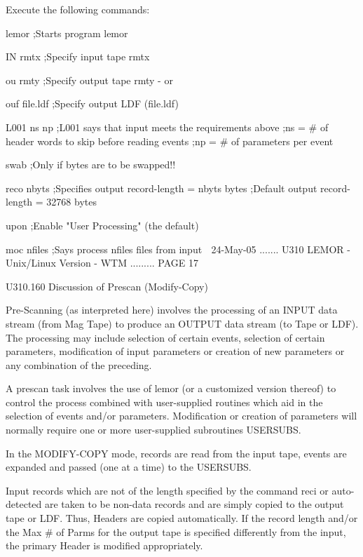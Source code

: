    Execute the following commands:
 
   lemor             ;Starts program lemor
 
   IN   rmtx         ;Specify input  tape rmtx
 
   ou   rmty         ;Specify output tape rmty  -  or
 
   ouf  file.ldf     ;Specify output LDF (file.ldf)
 
   L001 ns np        ;L001 says that input meets the requirements above
                     ;ns = # of header words to skip before reading events
                     ;np = # of parameters per event
 
   swab              ;Only if bytes are to be swapped!!
 
   reco nbyts        ;Specifies output record-length = nbyts bytes
                     ;Default   output record-length = 32768 bytes
 
   upon              ;Enable "User Processing" (the default)
 
   moc nfiles        ;Says process nfiles files from input
    
   24-May-05 ....... U310  LEMOR - Unix/Linux Version - WTM ......... PAGE  17
 
 
 
   U310.160  Discussion of Prescan (Modify-Copy)
 
   Pre-Scanning  (as  interpreted  here)  involves  the processing of an INPUT
   data stream (from Mag Tape) to produce an OUTPUT data stream  (to  Tape  or
   LDF).  The processing may include selection of certain events, selection of
   certain parameters, modification of input parameters  or  creation  of  new
   parameters or any combination of the preceding.
 
   A  prescan task involves the use of lemor (or a customized version thereof)
   to control the process combined with user-supplied routines  which  aid  in
   the  selection  of  events  and/or  parameters. Modification or creation of
   parameters will normally require  one  or  more  user-supplied  subroutines
   USERSUBS.
 
   In  the  MODIFY-COPY mode, records are read from the input tape, events are
   expanded and passed (one at a time) to the USERSUBS.
 
   Input records which are not of the length specified by the command reci  or
   auto-detected  are  taken  to  be non-data records and are simply copied to
   the output tape or LDF. Thus, Headers  are  copied  automatically.  If  the
   record  length  and/or  the Max # of Parms for the output tape is specified
   differently from the input, the primary Header is modified appropriately.
 
